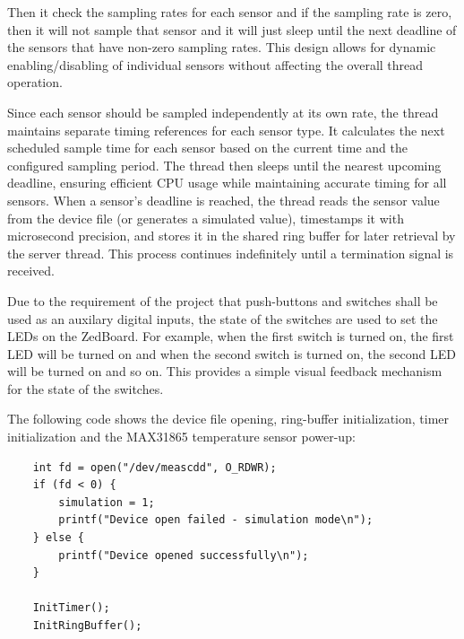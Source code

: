 Then it check the sampling rates for each sensor and if the sampling rate is zero, then it will not sample that sensor and it will just sleep until the next deadline of the sensors that have non-zero sampling rates. This design allows for dynamic enabling/disabling of individual sensors without affecting the overall thread operation.

Since each sensor should be sampled independently at its own rate, the thread maintains separate timing references for each sensor type. It calculates the next scheduled sample time for each sensor based on the current time and the configured sampling period. The thread then sleeps until the nearest upcoming deadline, ensuring efficient CPU usage while maintaining accurate timing for all sensors. When a sensor's deadline is reached, the thread reads the sensor value from the device file (or generates a simulated value), timestamps it with microsecond precision, and stores it in the shared ring buffer for later retrieval by the server thread. This process continues indefinitely until a termination signal is received.

Due to the requirement of the project that push-buttons and switches shall be used as an auxilary digital inputs, the state of the switches are used to set the LEDs on the ZedBoard. For example, when the first switch is turned on, the first LED will be turned on and when the second switch is turned on, the second LED will be turned on and so on. This provides a simple visual feedback mechanism for the state of the switches.

The following code shows the device file opening, ring-buffer initialization, timer initialization and the MAX31865 temperature sensor power-up: 
\begin{verbatim}
	int fd = open("/dev/meascdd", O_RDWR);
    if (fd < 0) {
        simulation = 1;
        printf("Device open failed - simulation mode\n");
    } else {
        printf("Device opened successfully\n");
    }

    InitTimer();
    InitRingBuffer();
\end{verbatim}

